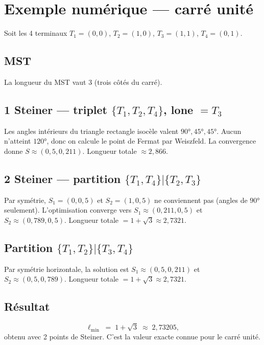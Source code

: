 \documentclass[12pt, a4paper]{article}
\begin{document}
\section{Exemple numérique — carré unité}

Soit les 4 terminaux $T_1=(0,0)$, $T_2=(1,0)$, $T_3=(1,1)$, $T_4=(0,1)$.

\subsection{MST}
La longueur du MST vaut $3$ (trois côtés du carré).

\subsection{1 Steiner — triplet $\{T_1, T_2, T_4\}$, lone $= T_3$}
Les angles intérieurs du triangle rectangle isocèle valent $90°, 45°, 45°$.
Aucun n'atteint $120°$, donc on calcule le point de Fermat par Weiszfeld.
La convergence donne $S \approx (0{,}5, 0{,}211)$.
Longueur totale $\approx 2{,}866$.

\subsection{2 Steiner — partition $\{T_1, T_4\}|\{T_2, T_3\}$}
Par symétrie, $S_1 = (0, 0{,}5)$ et $S_2 = (1, 0{,}5)$ ne conviennent pas
(angles de $90°$ seulement). L'optimisation converge vers
$S_1 \approx (0{,}211, 0{,}5)$ et $S_2 \approx (0{,}789, 0{,}5)$.
Longueur totale $= 1 + \sqrt{3} \approx 2{,}7321$.

\subsection{Partition $\{T_1, T_2\}|\{T_3, T_4\}$}
Par symétrie horizontale, la solution est $S_1 \approx (0{,}5, 0{,}211)$
et $S_2 \approx (0{,}5, 0{,}789)$.
Longueur totale $= 1 + \sqrt{3} \approx 2{,}7321$.

\subsection{Résultat}
\[
    \ell_{\min} \;=\; 1 + \sqrt{3} \;\approx\; 2{,}73205,
\]
obtenu avec 2 points de Steiner. C'est la valeur exacte connue pour le carré unité.

\end{document}
